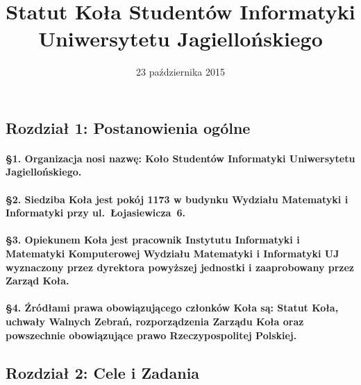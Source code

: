 \documentclass{article}
\title{Statut Koła Studentów Informatyki Uniwersytetu Jagiellońskiego}
\date{23 października 2015}
\begin{document}
\maketitle

\vspace{0.2cm}
\begin{center}
    \section*{Rozdział 1: Postanowienia ogólne}
\end{center}\vspace{0.4cm}
	\paragraph{\S 1. Organizacja nosi nazwę: Koło Studentów Informatyki Uniwersytetu Jagiellońskiego.}
	\paragraph{\S 2. Siedziba Koła jest pokój 1173 w budynku Wydziału Matematyki i Informatyki przy
\mbox{ul. Łojasiewicza~6.}}
	\paragraph{\S 3. Opiekunem Koła jest pracownik Instytutu Informatyki i Matematyki Komputerowej Wydziału Matematyki i Informatyki UJ
         wyznaczony przez dyrektora powyższej jednostki i zaaprobowany przez Zarząd Koła.
        }
	\paragraph{\S 4. Źródłami prawa obowiązującego członków Koła są: Statut Koła, uchwały Walnych Zebrań, rozporządzenia Zarządu Koła oraz
         powszechnie obowiązujące prawo Rzeczypospolitej Polskiej.
        }

\begin{center}\vspace{0.4cm}
    \section*{Rozdział 2: Cele i Zadania}
\end{center}\vspace{0.4cm}
\end{document}

